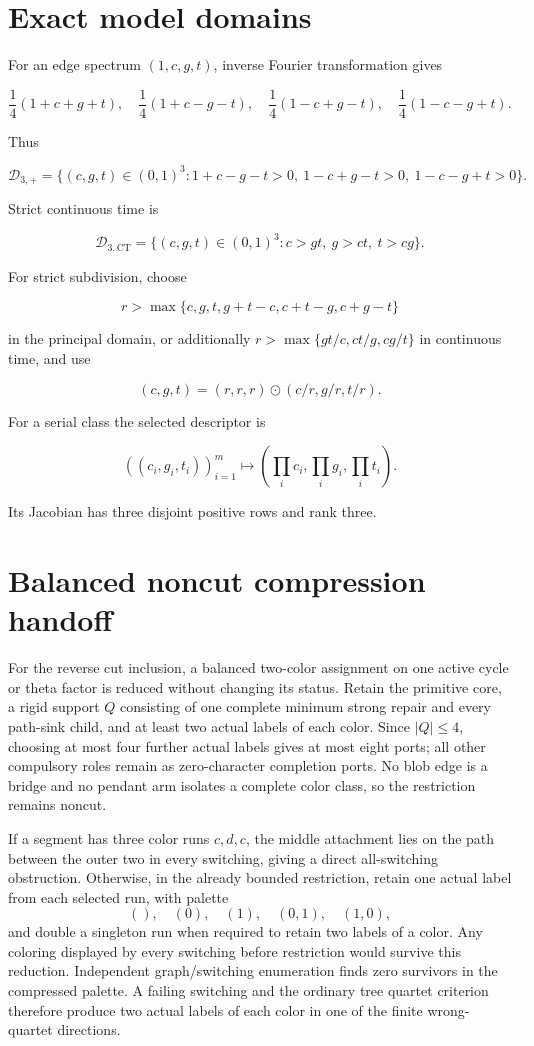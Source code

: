 \documentclass[10pt]{article}
\newcommand{\Dplus}{\mathcal D_{3,+}}
\newcommand{\Dct}{\mathcal D_{3,\mathrm{CT}}}
\begin{document}
\section{Exact model domains}

For an edge spectrum \((1,c,g,t)\), inverse Fourier transformation gives

\[
\frac14(1+c+g+t),\quad
\frac14(1+c-g-t),\quad
\frac14(1-c+g-t),\quad
\frac14(1-c-g+t).
\]

Thus

\[
\Dplus=\{(c,g,t)\in(0,1)^3:
1+c-g-t>0,\ 1-c+g-t>0,\ 1-c-g+t>0\}.
\]

Strict continuous time is

\[
\Dct=\{(c,g,t)\in(0,1)^3:c>gt,\ g>ct,\ t>cg\}.
\]

For strict subdivision, choose

\[
r>\max\{c,g,t,g+t-c,c+t-g,c+g-t\}
\]

in the principal domain, or additionally
\(r>\max\{gt/c,ct/g,cg/t\}\) in continuous time, and use

\[
(c,g,t)=(r,r,r)\odot(c/r,g/r,t/r).
\]

For a serial class the selected descriptor is

\[
((c_i,g_i,t_i))_{i=1}^m\mapsto
(\prod_i c_i,\prod_i g_i,\prod_i t_i).
\]

Its Jacobian has three disjoint positive rows and rank three.

\section{Balanced noncut compression handoff}

For the reverse cut inclusion, a balanced two-color assignment on one active
cycle or theta factor is reduced without changing its status.  Retain the
primitive core, a rigid support \(Q\) consisting of one complete minimum
strong repair and every path-sink child, and at least two actual labels of
each color.  Since \(|Q|\le4\), choosing at most four further actual labels
gives at most eight ports; all other compulsory roles remain as
zero-character completion ports.  No blob edge is a bridge and no pendant
arm isolates a complete color class, so the restriction remains noncut.

If a segment has three color runs \(c,d,c\), the middle attachment lies on
the path between the outer two in every switching, giving a direct
all-switching obstruction.  Otherwise, in the already bounded restriction,
retain one actual label from each selected run, with palette
\[
(),\quad(0),\quad(1),\quad(0,1),\quad(1,0),
\]
and double a singleton run when required to retain two labels of a color.
Any coloring displayed by every switching before restriction would survive
this reduction.  Independent graph/switching enumeration finds zero
survivors in the compressed palette.  A failing switching and the ordinary
tree quartet criterion therefore produce two actual labels of each color in
one of the finite wrong-quartet directions.
\end{document}
